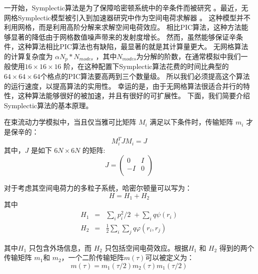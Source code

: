 {一开始，Symplectic算法是为了保障哈密顿系统中的辛条件而被研究 \cite{symplectic_channel1990, symplectic_yoshida1990}。最近，无网格Symplectic模型被引入到加速器研究中作为空间电荷求解器 \cite{symplectic_ji2017}。
这种模型并不利用网格，而是利用高阶分解来求解空间电荷效应。
相比PIC算法，这种方法能够显著的降低由于网格数值噪声带来的发射度增长。
然而，虽然能够保证辛条件，这种算法相比PIC算法也有缺陷，最显著的就是其计算量更大。
无网格算法的计算复杂度为 $\alpha N_p * N_{modes}$ ，其中$N_{modes}$为分解的阶数，在通常模拟中我们一般使用$16 \times 16 \times 16$ 阶，在这种配置下Symplectic算法花费的时间比典型的$64 \times 64 \times 64$个格点的PIC算法要高两到三个数量级。
所以我们必须提高这个算法的运行速度，以提高算法的实用性。
幸运的是，由于无网格算法很适合并行的特性，这种算法能够很好的被加速，并且有很好的可扩展性。
下面，我们简要介绍Symplectic算法的基本原理。

在束流动力学模拟中，当且仅当雅可比矩阵 $M_i$ 满足以下条件时，传输矩阵 $m_i$ 才是保辛的\cite{accelerator2004lee, accelerator2013chao}：
\begin{equation}
M_{i}^{T}J{{M}_{i}}=J
\end{equation}
其中，$J$ 是如下 $6N\times6N$ 的矩阵:
\begin{equation}
J=\left(
  \begin{array}{cc}
     0 & I \\
    -I & 0 \\
  \end{array}
\right)
\end{equation}

对于考虑其空间电荷力的多粒子系统，哈密尔顿量可以写为：
\begin{equation}
H={{H}_{1}}+{{H}_{2}}
\end{equation}
其中
\begin{eqnarray}
  {H}_{1} &=& \sum\limits_{i}{{p_{i}^{2}}/{2}\;}+\sum\limits_{i}{q\psi ({{r}_{i}})} \\
  {H}_{2} &=& \frac{1}{2}\sum\limits_{i}{\sum\limits_{j}{q\varphi ({{r}_{i}},{{r}_{j}})}}
\end{eqnarray}

其中${{H}_{1}}$ 只包含外场信息，而 ${{H}_{2}}$ 只包括空间电荷效应。根据${{H}_{1}}$ 和 ${{H}_{2}}$ 得到的两个传输矩阵 ${{m}_{1}}$和 ${{m}_{2}}$，一个二阶传输矩阵$m\left( \tau  \right)$可以被定义为：
\begin{equation}
m\left( \tau  \right)={{m}_{1}}\left( \tau /2 \right){{m}_{2}}\left( \tau  \right){{m}_{1}}\left( \tau /2 \right)
\end{equation}

}
